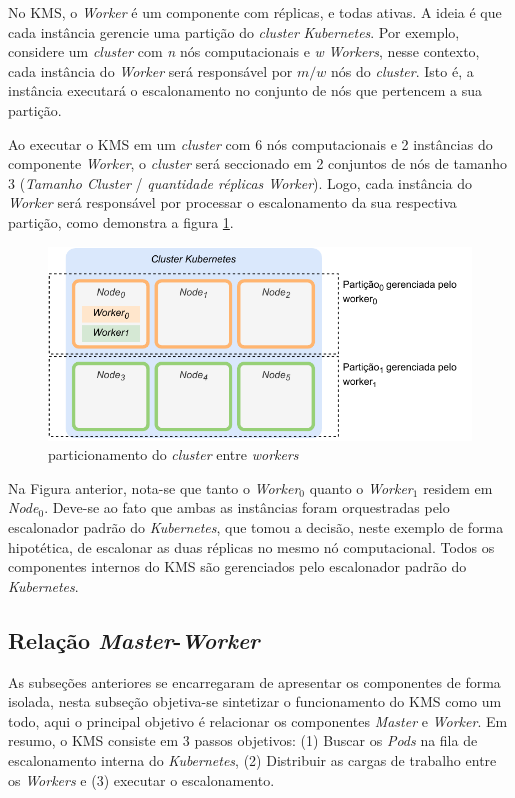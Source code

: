 No \ac{KMS}, o \textit{Worker} é um componente com réplicas, e todas ativas. A ideia é que cada instância gerencie uma partição do \textit{cluster} \textit{Kubernetes}. Por exemplo, considere um \textit{cluster} com \textit{n} nós computacionais e \textit{w} \textit{Workers}, nesse contexto, cada instância do \textit{Worker} será responsável por $m/w$ nós do \textit{cluster}. Isto é, a instância executará o escalonamento no conjunto de nós que pertencem a sua partição.

Ao executar o \ac{KMS} em um \textit{cluster} com 6 nós computacionais e 2 instâncias do componente \textit{Worker}, o \textit{cluster} será seccionado em 2 conjuntos de nós de tamanho 3 (\textit{Tamanho Cluster} / \textit{quantidade réplicas Worker}). Logo, cada instância do \textit{Worker} será responsável por processar o escalonamento da sua respectiva partição, como demonstra a figura \ref{fig:particionamento-worker}.

\begin{figure}[h!]
	\caption{\label{fig:particionamento-worker} particionamento do \textit{cluster} entre \textit{workers}}
	\centering
	\includegraphics[width=\linewidth]{assets/particionamento-worker.pdf}
\end{figure}

Na Figura anterior, nota-se que tanto o \textit{Worker$_0$} quanto o \textit{Worker$_1$} residem em \textit{Node$_0$}. Deve-se ao fato que ambas as instâncias foram orquestradas pelo escalonador padrão do \textit{Kubernetes}, que tomou a decisão, neste exemplo de forma hipotética, de escalonar as duas réplicas no mesmo nó computacional. Todos os componentes internos do \ac{KMS} são gerenciados pelo escalonador padrão do \textit{Kubernetes}.

\subsection{Relação \textit{Master}-\textit{Worker}}
As subseções anteriores se encarregaram de apresentar os componentes de forma isolada, nesta subseção objetiva-se sintetizar o funcionamento do \ac{KMS} como um todo, aqui o principal objetivo é relacionar os componentes \textit{Master} e \textit{Worker}. Em resumo, o \ac{KMS} consiste em 3 passos objetivos: (1) Buscar os \textit{Pods} na fila de escalonamento interna do \textit{Kubernetes}, (2) Distribuir as cargas de trabalho entre os \textit{Workers} e (3) executar o escalonamento.

